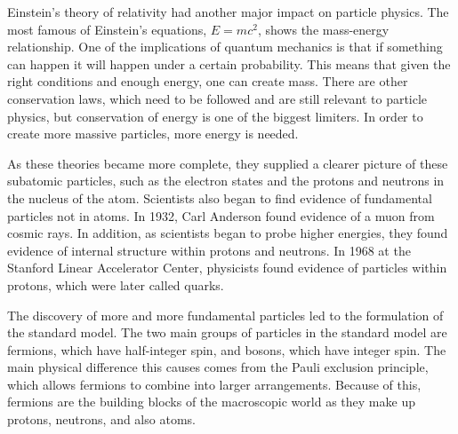 Einstein's theory of relativity had another major impact on particle physics. The most famous of Einstein's equations, $E = mc^2$, shows the mass-energy relationship. One of the implications of quantum mechanics is that if something can happen it will happen under a certain probability. This means that given the right conditions and enough energy, one can create mass. There are other conservation laws, which need to be followed and are still relevant to particle physics, but conservation of energy is one of the biggest limiters. In order to create more massive particles, more energy is needed. 

As these theories became more complete, they supplied a clearer picture of these subatomic particles, such as the electron states and the protons and neutrons in the nucleus of the atom. Scientists also began to find evidence of fundamental particles not in atoms. In 1932, Carl Anderson found evidence of a muon from cosmic rays. In addition, as scientists began to probe higher energies, they found evidence of internal structure within protons and neutrons. In 1968 at the Stanford Linear Accelerator Center, physicists found evidence of particles within protons, which were later called quarks.

The discovery of more and more fundamental particles led to the formulation of the standard model. The two main groups of particles in the standard model are fermions, which have half-integer spin, and bosons, which have integer spin. The main physical difference this causes comes from the Pauli exclusion principle, which allows fermions to combine into larger arrangements. Because of this, fermions are the building blocks of the macroscopic world as they make up protons, neutrons, and also atoms.   

